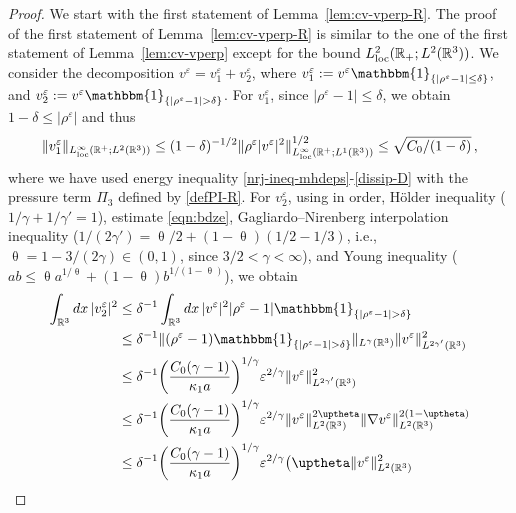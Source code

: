 \documentclass[11pt,reqno]{amsart}
\def \R{{\mathbb{R}}}
\begin{document}
\begin{proof}
  We start with the first statement of Lemma~\ref{lem:cv-vperp-R}. The proof of the first statement of  Lemma~\ref{lem:cv-vperp-R} is similar to the one of the first statement of  Lemma~\ref{lem:cv-vperp} except for the bound $ L_{\rm loc}^2(\R_+; L^2(\R^3))$. We consider the decomposition $v^\varepsilon=v_1^\varepsilon + v_2^\varepsilon$, where $v_1^\varepsilon := v^\varepsilon \mathbbm{1}_{\{|\rho^\varepsilon -1| \leq \delta \}}$, and $v_2^\varepsilon := v^\varepsilon \mathbbm{1}_{\{|\rho^\varepsilon -1| > \delta \}}$. For $v_1^\varepsilon$, since $|\rho^\varepsilon -1| \leq \delta$, we obtain $1-\delta \leq |\rho^\varepsilon|$ and thus
\begin{equation}
\|v_1^\varepsilon\|_{L_{\rm loc}^\infty(\R^+;L^2(\R^3))} \leq (1-\delta)^{-1/2}\|\rho^\varepsilon |v^\varepsilon|^2\|_{L_{\rm loc}^\infty(\R^+;L^1(\R^3))}^{1/2}
\leq \sqrt{C_0/(1-\delta)}\,,
\label{eqn:HGN-1}
\end{equation}
where we have used energy inequality \eqref{nrj-ineq-mhdeps}-\eqref{dissip-D} with the pressure term $\Pi_3$ defined by \eqref{defPI-R}.
For $v_2^\varepsilon$, using in order, H\"older inequality ($1/\gamma + 1/\gamma'=1$), estimate \eqref{eqn:bdze}, Gagliardo--Nirenberg interpolation inequality ($1/(2\gamma') = \uptheta/2 +  (1-\uptheta)(1/2-1/3) $, i.e.,  $\uptheta = 1-3/(2\gamma) \in (0,1)$, since $3/2 <\gamma <\infty$), and Young inequality ($ab \leq \uptheta a^{1/\uptheta} + (1-\uptheta) b^{1/(1-\uptheta)}$), we obtain
\begin{align}
  \int_{\R^3}dx \, |v_2^\varepsilon|^2 & \leq \delta^{-1} \int_{\R^3}dx \, |v^\varepsilon|^2
  |\rho^\varepsilon -1|\mathbbm{1}_{\{|\rho^\varepsilon -1| > \delta \}} \nonumber \\
  &\leq \delta^{-1}\|(\rho^\varepsilon -1)\mathbbm{1}_{\{|\rho^\varepsilon -1| > \delta \}} \|_{L^{\gamma}(\R^3)}\| v^\varepsilon\|_{L^{2\gamma'}(\R^3)}^2\nonumber \\
  & \leq \delta^{-1}\bigg(\frac{C_0(\gamma-1)}{\kappa_1  a}\bigg)^{1/\gamma}\varepsilon^{2/\gamma}\|v^\varepsilon\|_{L^{2\gamma'}(\R^3)}^2  \nonumber \\
  & \leq \delta^{-1}\bigg(\frac{C_0(\gamma-1)}{\kappa_1  a}\bigg)^{1/\gamma}\varepsilon^{2/\gamma} \|v^\varepsilon\|_{L^{2}(\R^3)}^{2\uptheta}
  \|\nabla v^\varepsilon\|_{L^{2}(\R^3)}^{2(1-\uptheta)} \nonumber \\
  & \leq \delta^{-1}\bigg(\frac{C_0(\gamma-1)}{\kappa_1  a}\bigg)^{1/\gamma}\varepsilon^{2/\gamma} \big( \uptheta\|v^\varepsilon\|_{L^{2}(\R^3)}^{2}

\end{align}
\end{proof}
\end{document}
